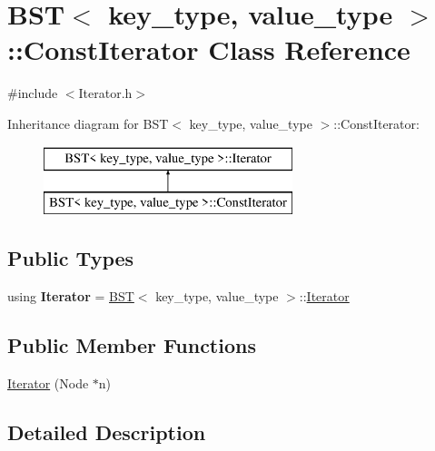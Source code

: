 \hypertarget{class_b_s_t_1_1_const_iterator}{}\section{B\+ST$<$ key\+\_\+type, value\+\_\+type $>$\+::Const\+Iterator Class Reference}
\label{class_b_s_t_1_1_const_iterator}


{\ttfamily \#include $<$Iterator.\+h$>$}

Inheritance diagram for B\+ST$<$ key\+\_\+type, value\+\_\+type $>$\+::Const\+Iterator\+:\begin{figure}[H]
\begin{center}
\leavevmode
\includegraphics[height=2.000000cm]{class_b_s_t_1_1_const_iterator}
\end{center}
\end{figure}
\subsection*{Public Types}
\begin{DoxyCompactItemize}
\item 
\mbox{\label{class_b_s_t_1_1_const_iterator_afd3a2e44719b069579a496c14eed2281}} 
using {\bfseries Iterator} = \mbox{\hyperlink{class_b_s_t}{B\+ST}}$<$ key\+\_\+type, value\+\_\+type $>$\+::\mbox{\hyperlink{class_b_s_t_1_1_iterator}{Iterator}}
\end{DoxyCompactItemize}
\subsection*{Public Member Functions}
\begin{DoxyCompactItemize}
\item 
\mbox{\hyperlink{class_b_s_t_1_1_const_iterator_af7bc2cb09f5e0e7c94ec2074c1ac1982}{Iterator}} (Node $\ast$n)
\end{DoxyCompactItemize}


\subsection{Detailed Description}
